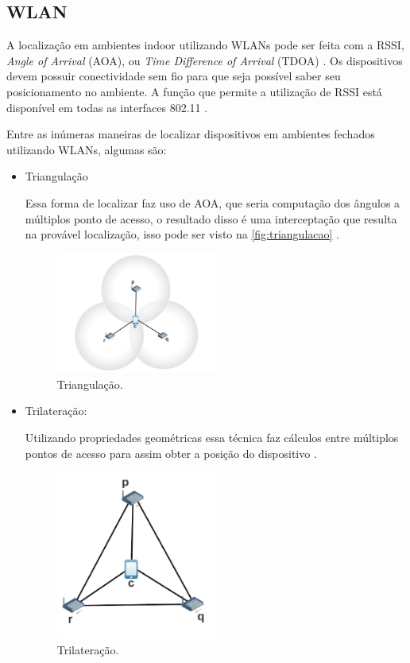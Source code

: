     \subsection{WLAN}
    \par
    A localização em ambientes indoor utilizando WLANs pode ser feita com a RSSI, \textit{Angle of Arrival} (AOA), ou \textit{Time Difference of Arrival} (TDOA) \cite{wifiFernandes}. Os dispositivos devem possuir conectividade sem fio para que seja possível saber seu posicionamento no ambiente. A função que permite a utilização de RSSI está disponível em todas as interfaces 802.11 \cite{Wlan2012}.
    
    \par
    Entre as inúmeras maneiras de localizar dispositivos em ambientes fechados utilizando WLANs, algumas são: 
    \begin{itemize}
        \item {Triangulação}
        \par
        Essa forma de localizar faz uso de AOA, que seria computação dos ângulos a múltiplos ponto de acesso, o resultado disso é uma interceptação que resulta na provável localização, isso pode ser visto na \autoref{fig:triangulacao} \cite{wifiFernandes}. 
           \begin{figure}[H]
              \caption{\label{fig:triangulacao}{Triangulação.}}
              \centering
              \includegraphics[width=0.5\textwidth]{Figuras/triangulacao.PNG}
        \end{figure}
        \item {Trilateração: }
        \par 
       Utilizando propriedades geométricas essa técnica faz cálculos entre múltiplos pontos de acesso para assim obter a posição do dispositivo \cite{wifiFernandes}.
        \begin{figure}[H]
              \caption{\label{fig:trilateracao}{Trilateração.}}
              \centering
              \includegraphics[width=0.5\textwidth]{Figuras/trilateracao.PNG}

\end{figure}
\end{itemize}
